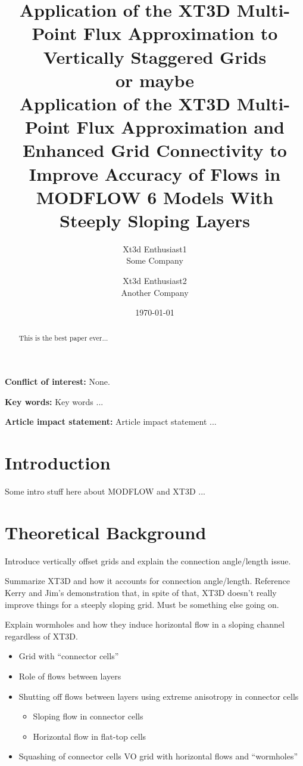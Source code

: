 \documentclass{article}
\title{Application of the XT3D Multi-Point Flux Approximation to Vertically Staggered Grids \\
	\normalsize or maybe \\
	\LARGE Application of the XT3D Multi-Point Flux Approximation and Enhanced Grid Connectivity to Improve Accuracy of Flows in MODFLOW 6 Models With Steeply Sloping Layers}
\author{Xt3d Enthusiast1  \\
	Some Company  \\
	\and 
	Xt3d Enthusiast2 \\
	Another Company \\
	}
\date{\today}
\begin{document}
\maketitle

\textbf{Conflict of interest:} None.

\textbf{Key words:} Key words ...

\textbf{Article impact statement:} Article impact statement ...

\begin{abstract}
This is the best paper ever... 
\end{abstract}

\section{Introduction}

Some intro stuff here about MODFLOW \citep{modflow6framework, modflow6gwf, modflow6gwt} and XT3D \citep{modflow6xt3d}...


\section{Theoretical Background}

Introduce vertically offset grids and explain the connection angle/length issue.

Summarize XT3D and how it accounts for connection angle/length.  Reference Kerry and Jim’s demonstration that, in spite of that, XT3D doesn’t really improve things for a steeply sloping grid.  Must be something else going on.

Explain wormholes and how they induce horizontal flow in a sloping channel regardless of XT3D.
\begin{itemize}
	\item Grid with “connector cells”
	\item Role of flows between layers
	\item Shutting off flows between layers using extreme anisotropy in connector cells
	\begin{itemize}
		\item Sloping flow in connector cells
		\item Horizontal flow in flat-top cells
	\end{itemize}
	\item Squashing of connector cells VO grid with horizontal flows and “wormholes”
\end{itemize}
\end{document}

